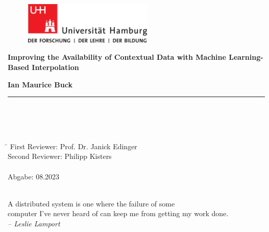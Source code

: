 \begin{titlepage}
	
	\setcounter{page}{-1}
	
	\begin{figure}[h]
		\begin{minipage}[b]{62mm}
			\includegraphics[width=62mm]{images/unilogo}
		\end{minipage}
		\hspace{4cm}
	\end{figure}
	
	\vfill
	
	\begin{center}
		\vspace{14mm}
		\noindent \textbf{\huge
			Improving the Availability of Contextual Data with Machine Learning-Based Interpolation
		}
		\vspace{60mm}	
	\end{center}
	
	\vfill
	
	\noindent \textbf{Ian Maurice Buck} \\
	\noindent \rule{\textwidth}{0.4mm} 
	 \\
	 \\
	 \\
	\begin{tabbing}
		\hspace{8em} \=  \kill
		First Reviewer: \> Prof. Dr. Janick Edinger \\
		Second Reviewer: \> Philipp Kisters \\
		~ \\
		Abgabe: 08.2023
	\end{tabbing}
	
	\newpage 
	\thispagestyle{empty}
	\setcounter{page}{0}
	
	~\\ \vfill \noindent 
	A distributed system is one where the failure of some \\
	computer I've never heard of can keep me from getting my work done. \\
	\textit{-- Leslie Lamport}
\end{titlepage}

